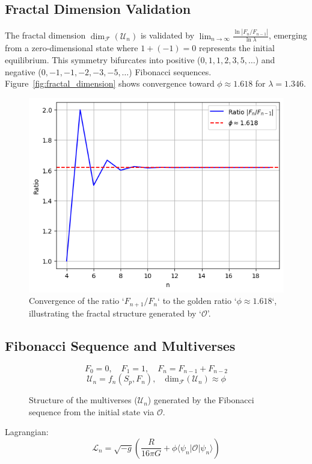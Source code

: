 \documentclass[aps,prl,twocolumn,groupedaddress]{revtex4-2}
\newcommand{\F}[1]{F_{#1}}
\newcommand{\U}[1]{\mathcal{U}_{#1}}
\newcommand{\Opp}{\mathcal{O}}
\newcommand{\dimfrac}{\mathrm{dim}_\mathscr{F}}
\begin{document}
\subsection{Fractal Dimension Validation}
The fractal dimension \(\dim_{\mathscr{F}}(\mathcal{U}_n)\) is validated by \(\lim_{n \to \infty} \frac{\ln |F_n / F_{n-1}|}{\ln \lambda}\), emerging from a zero-dimensional state where \(1 + (-1) = 0\) represents the initial equilibrium. This symmetry bifurcates into positive (\(0, 1, 1, 2, 3, 5, \ldots\)) and negative (\(0, -1, -1, -2, -3, -5, \ldots\)) Fibonacci sequences. Figure~\ref{fig:fractal_dimension} shows convergence toward \(\phi \approx 1.618\) for \(\lambda = 1.346\).

\begin{figure}
    \centering
    \includegraphics[width=\columnwidth]{figures/fibonacci_ratio.png}
    \caption{Convergence of the ratio `\(F_{n+1}/F_n\)` to the golden ratio `\(\phi \approx 1.618\)`, illustrating the fractal structure generated by `\(\mathcal{O}\)'.}
    \label{fig:fibonacci_ratio}
\end{figure}

\subsection{Fibonacci Sequence and Multiverses}
\begin{equation}
\F{0} = 0, \quad \F{1} = 1, \quad \F{n} = \F{n-1} + \F{n-2}
\label{eq:fibonacci}
\end{equation}
\begin{equation}
\U{n} = f_n(S_p, \F{n}), \quad \dimfrac(\U{n}) \approx \phi
\label{eq:univers}
\end{equation}
\begin{figure}
    \centering
    
    \caption{Structure of the multiverses (\(\U{n}\)) generated by the Fibonacci sequence from the initial state via \(\Opp\).}
    \label{fig:fibonacci}
\end{figure}
Lagrangian:
\begin{equation}
\mathcal{L}_n = \sqrt{-g} \left( \frac{R}{16\pi G} + \phi \langle \psi_n | \Opp | \psi_n \rangle \right)
\label{eq:lagrangian}
\end{equation}
\end{document}
